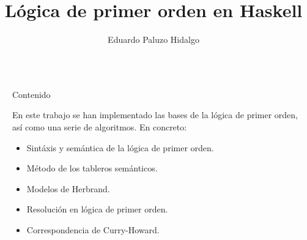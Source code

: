 \documentclass[final]{beamer}
\title{Lógica de primer orden en Haskell} %
\author{Eduardo Paluzo Hidalgo} %
\institute{Universidad de Sevilla} %
\newlength{\sepwid}
\newlength{\onecolwid}
\begin{document}

\setlength{\belowcaptionskip}{2ex} %
\setlength\belowdisplayshortskip{2ex} %

\begin{frame}[t,fragile] %

\begin{columns}[t] %

\begin{column}{\sepwid}\end{column} %

\begin{column}{\onecolwid} %


\begin{alertblock}{Contenido}

  En este trabajo se han implementado las bases de la lógica de primer orden, así como
  una serie de algoritmos. En concreto:
  
\begin{itemize}
\item Sintáxis y semántica de la lógica de primer orden.
\item Método de los tableros semánticos.
\item Modelos de Herbrand.
\item Resolución en lógica de primer orden.
\item Correspondencia de Curry-Howard.
\end{itemize}

\end{alertblock}



\end{column}
\end{columns}
\end{frame}
\end{document}
